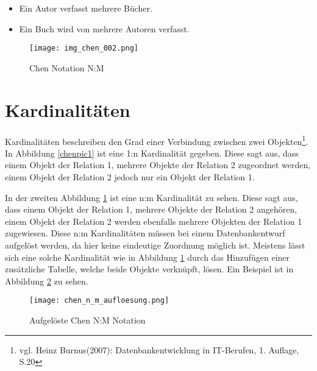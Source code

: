 \begin{itemize}
\item Ein Autor verfasst mehrere Bücher.
\item Ein Buch wird von mehrere Autoren verfasst.
\end{itemize}

\begin{figure}[H]
\begin{center}
\texttt{[image: img\_chen\_002.png]}
\caption{Chen Notation N:M}
\label{chenpic2}
\end{center}
\end{figure}

\section{Kardinalitäten}

Kardinalitäten beschreiben den Grad einer Verbindung zwischen zwei Objekten\footnote{vgl. Heinz Burnus(2007): Datenbankentwicklung in IT-Berufen, 1. Auflage, S.20}.
In Abbildung \ref{chenpic1} ist eine 1:n Kardinalität gegeben.
Diese sagt aus, dass einem Objekt der Relation 1, mehrere Objekte der Relation 2 zugeordnet werden, einem Objekt der Relation 2 jedoch nur ein Objekt der Relation 1.

In der zweiten Abbildung \ref{chenpic2} ist eine n:m Kardinalität zu sehen.
Diese sagt aus, dass einem Objekt der Relation 1, mehrere Objekte der Relation 2 angehören, einem Objekt der Relation 2 werden ebenfalls mehrere Objekten der Relation 1 zugewiesen.
Diese n:m Kardinalitäten müssen bei einem Datenbankentwurf aufgelöst werden, da hier keine eindeutige Zuordnung möglich ist. Meistens lässt sich eine solche Kardinalität wie in Abbildung \ref{chenpic2} durch das Hinzufügen einer zusätzliche Tabelle, welche beide Objekte verknüpft, lösen.
Ein Beispiel ist in Abbildung \ref{chenpic3} zu sehen.

\begin{figure}[H]
\begin{center}
\texttt{[image: chen\_n\_m\_aufloesung.png]}
\caption{Aufgelöste Chen N:M Notation}
\label{chenpic3}
\end{center}
\end{figure}

